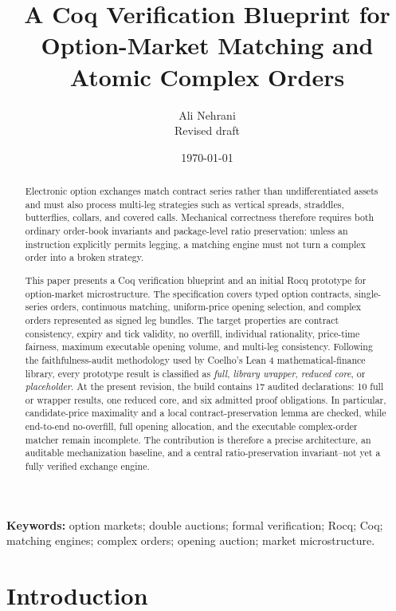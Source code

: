 \documentclass[11pt]{article}
\title{A Coq Verification Blueprint for Option-Market Matching and Atomic Complex Orders}
\author{Ali Nehrani\\
\small Revised draft}
\date{\today}
\begin{document}
\maketitle

\begin{abstract}
Electronic option exchanges match contract series rather than undifferentiated assets and must also process multi-leg strategies such as vertical spreads, straddles, butterflies, collars, and covered calls. Mechanical correctness therefore requires both ordinary order-book invariants and package-level ratio preservation: unless an instruction explicitly permits legging, a matching engine must not turn a complex order into a broken strategy.

This paper presents a Coq verification blueprint and an initial Rocq prototype for option-market microstructure. The specification covers typed option contracts, single-series orders, continuous matching, uniform-price opening selection, and complex orders represented as signed leg bundles. The target properties are contract consistency, expiry and tick validity, no overfill, individual rationality, price-time fairness, maximum executable opening volume, and multi-leg consistency. Following the faithfulness-audit methodology used by Coelho's Lean 4 mathematical-finance library, every prototype result is classified as \emph{full}, \emph{library wrapper}, \emph{reduced core}, or \emph{placeholder}. At the present revision, the build contains 17 audited declarations: 10 full or wrapper results, one reduced core, and six admitted proof obligations. In particular, candidate-price maximality and a local contract-preservation lemma are checked, while end-to-end no-overfill, full opening allocation, and the executable complex-order matcher remain incomplete. The contribution is therefore a precise architecture, an auditable mechanization baseline, and a central ratio-preservation invariant--not yet a fully verified exchange engine.
\end{abstract}

\noindent\textbf{Keywords:} option markets; double auctions; formal verification; Rocq; Coq; matching engines; complex orders; opening auction; market microstructure.

\section{Introduction}
\end{document}
